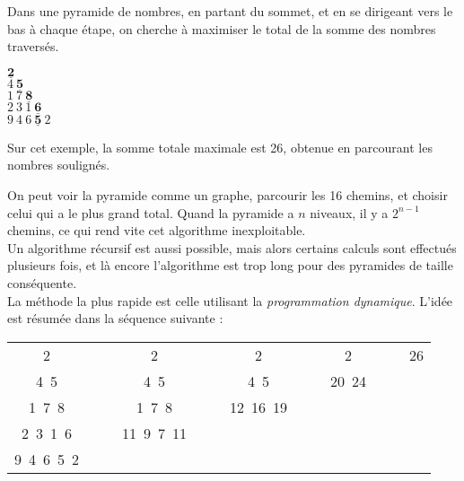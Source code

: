 \exer{}
\setcounter{numques}{0}

Dans une pyramide de nombres, en partant du sommet, et en se dirigeant vers le bas à 
chaque étape, on cherche à maximiser le total de la somme des nombres traversés.

\begin{center}
$ \underline{\textbf{2}}$\\$4\ \underline{\textbf{5}}$\\$1\ 7\ 
\underline{\textbf{8}}$\\$2\ 3\ 1\ \underline{\textbf{6}}$\\$9\ 4\ 6\ 
\underline{\textbf{5}}\ 2$\end{center}

Sur cet exemple, la somme totale maximale est 26, obtenue en parcourant les nombres soulignés.


On peut voir la pyramide comme un graphe, parcourir les 16 chemins, et choisir celui qui 
a le plus grand total. Quand la pyramide a $n$ niveaux, il y a $2^{n-1}$ chemins, ce qui 
rend vite cet algorithme inexploitable.\\
Un algorithme récursif est aussi possible, mais alors certains calculs sont effectués 
plusieurs fois, et là encore l'algorithme est trop long pour des pyramides de taille 
conséquente.\\
La méthode la plus rapide est celle utilisant la \emph{programmation dynamique}. L'idée 
est résumée dans la séquence suivante :

\begin{center}
\begin{tabular}{ccccccccccccc}
 2 &\hspace{1cm}&& 2 &\hspace{1cm}&& 2 &\hspace{1cm}&& 2&\hspace{1cm}& &26\\
 4\ 5 &\hspace{1cm}&& 4\ 5 &\hspace{1cm}&& 4\ 5 &\hspace{1cm}&& 20\ 24 &\hspace{1cm}&&\\
 1\ 7\ 8 &\hspace{1cm}&& 1\ 7\ 8&\hspace{1cm}&& 12\ 16\ 19 &\hspace{1cm}&& 
&\hspace{1cm}&&\\
 2\ 3\ 1\ 6 &\hspace{1cm}&& 11\ 9\ 7\ 11 &\hspace{1cm}&& &\hspace{1cm}&& &\hspace{1cm}&& 
\\
 9\ 4\ 6\ 5\ 2 &\hspace{1cm}&& &\hspace{1cm}&& &\hspace{1cm}&& &\hspace{1cm}&&
\end{tabular}
\end{center}

